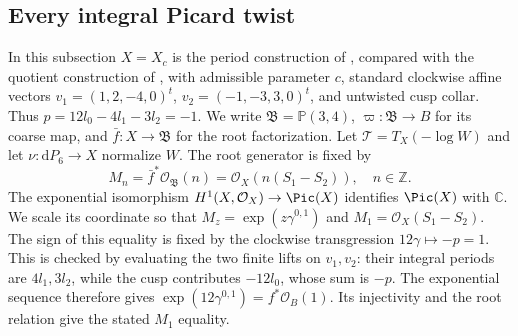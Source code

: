 \subsection{Every integral Picard twist}\label{sec:tangent-twists}

\begin{definition}\label{cdp:notation-integral-twists}
In this subsection $X=X_c$ is the period construction of \cite{AC26}, compared with the quotient construction of \cite{E26}, with admissible parameter $c$, standard clockwise affine vectors
$v_1=(1,2,-4,0)^t$, $v_2=(-1,-3,3,0)^t$, and untwisted cusp collar. Thus $p=12l_0-4l_1-3l_2=-1$. We write $\mathfrak B=\mathbb P(3,4)$, $\varpi:\mathfrak B\to B$ for its coarse map, and $\bar f:X\to\mathfrak B$ for the root factorization. Let $\mathcal T=T_X(-\log W)$ and let $\nu:\mathrm dP_6\to X$ normalize $W$. The root generator is fixed by
\[
 M_n=\bar f^*\mathcal O_{\mathfrak B}(n)
     =\mathcal O_X(n(S_1-S_2)),\quad n\in\mathbb Z.
\]
The exponential isomorphism $H^1(X,\mathcal O_X)\to\Pic(X)$ identifies $\Pic(X)$ with $\mathbb C$. We scale its coordinate so that $M_z=\exp(z\gamma^{0,1})$ and $M_1=\mathcal O_X(S_1-S_2)$. The sign of this equality is fixed by the clockwise transgression $12\gamma\mapsto-p=1$. This is checked by evaluating the two finite lifts on $v_1,v_2$: their integral periods are $4l_1,3l_2$, while the cusp contributes $-12l_0$, whose sum is $-p$. The exponential sequence therefore gives $\exp(12\gamma^{0,1})=f^*\mathcal O_B(1)$. Its injectivity and the root relation give the stated $M_1$ equality.
\end{definition}

